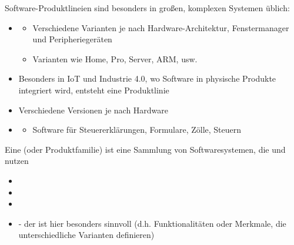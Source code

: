 \begin{infoBox}[title=Beispiele für Software-Produktlinien]
    Software-Produktlineien sind besonders in großen, komplexen Systemen üblich:
    \begin{itemize}
        \item {}
        \begin{itemize}
            \item {} Verschiedene Varianten je nach Hardware-Architektur, Fenstermanager und Peripheriegeräten
            \item {} Varianten wie Home, Pro, Server, ARM, usw.
        \end{itemize}
        \item {} Besonders in IoT und Industrie 4.0, wo Software in physische Produkte integriert wird, entsteht eine Produktlinie
        \item {} Verschiedene Versionen je nach Hardware
        \item {}
        \begin{itemize}
            \item Software für Steuererklärungen, Formulare, Zölle, Steuern
        \end{itemize}
    \end{itemize}
\end{infoBox}
\begin{infoBox}[title=Was ist eine Software-Produktlinie?]
    Eine  (oder Produktfamilie) ist eine Sammlung von Softwaresystemen, die  und  nutzen\\
    \begin{itemize}
        \item {}
        \item {}
        \item {}
    \end{itemize}
    \begin{itemize}
        \item {} - der  ist hier besonders sinnvoll (d.h. Funktionalitäten oder Merkmale, die unterschiedliche Varianten definieren)
    \end{itemize}
\end{infoBox}
